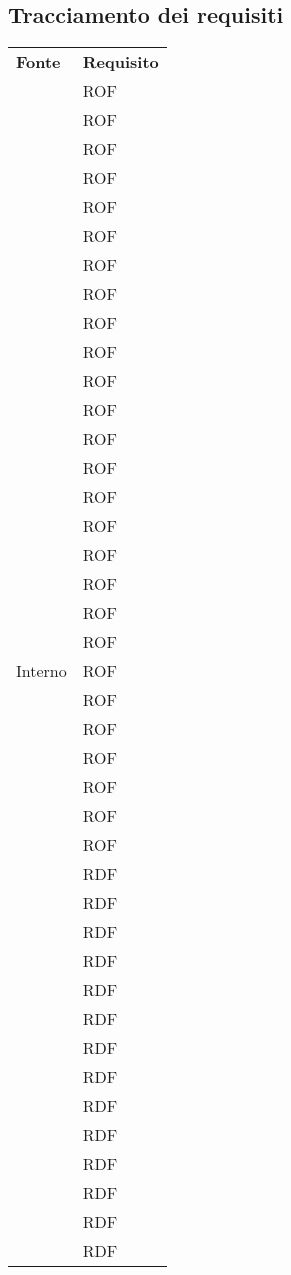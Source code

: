 \subsection{Tracciamento dei requisiti}
\begin{longtable}{| p{5cm} | p{5cm} |}
		\rowcolor{LightBlue}
		\color{white}\bfseries Fonte & \color{white}\bfseries Requisito \\[0.25cm]
\multirow[t]{61}{*}{Interno}		
				 & 	ROF \\
				&	ROF \\
				&	ROF \\
				&	ROF \\
				&	ROF \\
				&	ROF \\
				&	ROF \\
				&	ROF \\
				&	ROF \\
				&	ROF \\
				&	ROF \\
				&	ROF \\
				&	ROF \\
				&	ROF \\
				&	ROF \\
				& 	ROF \\
				& 	ROF \\
				& 	ROF \\
				& 	ROF \\
				& 	ROF \\
				& 	ROF \\
				& 	ROF \\
				& 	ROF \\
				& 	ROF \\
				& 	ROF \\
				& 	ROF \\
				& 	ROF \\
				&	RDF\\
				&	RDF\\
				&	RDF \\
				&	RDF \\
				&	RDF \\
				&	RDF \\
				&	RDF \\
				&	RDF \\
				&	RDF \\
				&	RDF \\
				&	RDF \\
				&	RDF \\
				&	RDF \\
				&	RDF \\

\end{longtable}
